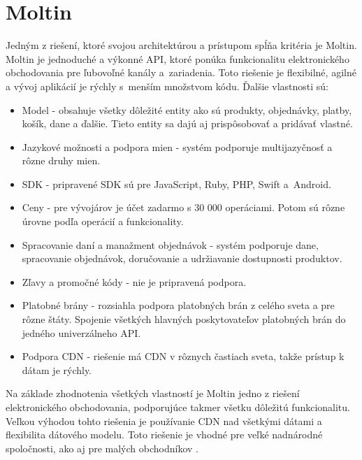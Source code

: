 \documentclass[
  printed, %
  table,   %
  lof,     %
  nolot,     %
  twoside,  
]{fithesis3}
\begin{document}
\section{Moltin}
Jedným z riešení, ktoré svojou architektúrou a prístupom spĺňa kritéria je Moltin. Moltin je jednoduché a výkonné API, ktoré ponúka funkcionalitu elektronického obchodovania pre ľubovoľné kanály a~zariadenia. Toto riešenie je flexibilné, agilné a vývoj aplikácií je rýchly s~menším množstvom kódu. Ďalšie vlastnosti sú: 
\begin{itemize}
	\item Model - obsahuje všetky dôležité entity ako sú produkty, objednávky, platby, košík, dane a ďalšie. Tieto entity sa dajú aj prispôsobovať a pridávať vlastné.
	\item Jazykové možnosti a podpora mien - systém podporuje multijazyčnosť a rôzne druhy mien.
	\item SDK - pripravené SDK sú pre JavaScript, Ruby, PHP, Swift a~Android.
	\item Ceny - pre vývojárov je účet zadarmo s 30 000 operáciami. Potom  sú rôzne úrovne podľa operácií a funkcionality.
	\item Spracovanie daní a manažment objednávok - systém podporuje dane, spracovanie objednávok, doručovanie a udržiavanie dostupnosti produktov. 
	\item Zľavy a promočné kódy - nie je pripravená podpora.
	\item Platobné brány - rozsiahla podpora platobných brán z celého sveta a pre rôzne štáty. Spojenie všetkých hlavných poskytovateľov platobných brán do jedného univerzálneho API.
	\item Podpora CDN - riešenie má CDN v rôznych častiach sveta, takže prístup k dátam je rýchly.
	\end{itemize}
Na základe zhodnotenia všetkých vlastností je Moltin jedno z riešení elektronického obchodovania, podporujúce takmer všetku dôležitú funkcionalitu. Veľkou výhodou tohto riešenia je používanie CDN nad všetkými dátami a flexibilita dátového modelu. Toto riešenie je vhodné pre veľké nadnárodné spoločnosti, ako aj pre malých obchodníkov \cite{Moltin}.
\end{document}
